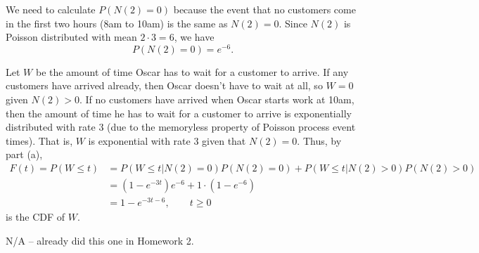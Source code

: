 \documentclass{homework}
\begin{document}
	\maketitle
	
	\question
	
	\begin{alphaparts}
		\questionpart We need to calculate $P(N(2) = 0)$ because the event that no customers come in the first two hours (8am to 10am) is the same as $N(2) = 0$. Since $N(2)$ is Poisson distributed with mean $2\cdot 3 = 6$, we have
		\begin{equation*}
			P(N(2) = 0) = e^{-6}.
		\end{equation*}
		
		\questionpart Let $W$ be the amount of time Oscar has to wait for a customer to arrive. If any customers have arrived already, then Oscar doesn't have to wait at all, so $W = 0$ given $N(2) > 0$. If no customers have arrived when Oscar starts work at 10am, then the amount of time he has to wait for a customer to arrive is exponentially distributed with rate 3 (due to the memoryless property of Poisson process event times). That is, $W$ is exponential with rate 3 given that $N(2) = 0$. Thus, by part (a),
		\begin{align*}
			F(t) = P(W \le t) &= P(W \le t | N(2) = 0)P(N(2) = 0) + P(W \le t| N(2) > 0)P(N(2) > 0) \\
			&= (1-e^{-3t})e^{-6} + 1\cdot(1-e^{-6}) \\
			&= 1 - e^{-3t-6}, \qquad t \ge 0
		\end{align*}
		is the CDF of $W$.
	\end{alphaparts}
	
	\question N/A -- already did this one in Homework 2.
	
	\question 
	
\end{document}
